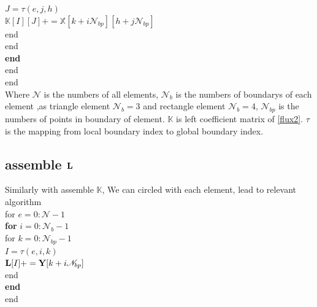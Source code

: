\documentclass[10pt,reqno, final]{amsart}
\begin{document}
                    \hspace*{100pt}$J = \tau(e, j, h)$  \\%
                    \hspace*{100pt}$\mathbb{K}[I][J] += \mathbb{X}[k+i\mathscr N_{bp}][h+j\mathscr N_{bp}]$ \\
                \hspace*{80pt}end\\
            \hspace*{60pt}end\\
        \hspace*{40pt}\textbf{end}\\
    \hspace*{20pt}end\\
end\\
Where $\mathscr N$ is the numbers of all elements, $\mathscr N_b$ is the numbers of boundarys of each element ,as triangle element $\mathscr N_b=3$ and rectangle element $\mathscr N_b=4$, $\mathscr N_{bp}$ is the numbers of points in boundary of element. $\mathbb{K}$ is left coefficient matrix of \eqref{flux2}. $\tau$ is the mapping from local boundary index to global boundary index. \\

\subsection{assemble $\bf{L}$}
Similarly with assemble $\mathbb{K}$, We can circled with each element, lead to relevant algorithm\\
for $e=0:\mathscr N-1 $ \\%
\hspace*{20pt}\textbf{for} $i=0:\mathscr N_b-1 $  \\%
        \hspace*{40pt}for $k=0:\mathscr N_{bp}-1 $ \\%
            \hspace*{60pt}$I = \tau(e, i, k)$  \\%
            \hspace*{60pt}${\bf L}[I] += {\bf Y}[k+i\mathscr N_{bp}]$ \\%
        \hspace*{40pt}end\\
    \hspace*{20pt}\textbf{end}\\
end
\end{document}
